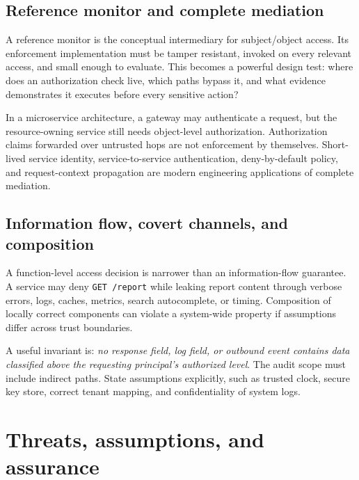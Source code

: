 \documentclass[
  letterpaper,
]{article}
\begin{document}
\subsection{Reference monitor and complete
mediation}\label{reference-monitor-and-complete-mediation}

A reference monitor is the conceptual intermediary for subject/object
access. Its enforcement implementation must be tamper resistant, invoked
on every relevant access, and small enough to evaluate. This becomes a
powerful design test: where does an authorization check live, which
paths bypass it, and what evidence demonstrates it executes before every
sensitive action?

\begin{modernextension}
In a microservice architecture, a gateway may authenticate a request, but the resource-owning service still needs object-level authorization. Authorization claims forwarded over untrusted hops are not enforcement by themselves. Short-lived service identity, service-to-service authentication, deny-by-default policy, and request-context propagation are modern engineering applications of complete mediation.
\end{modernextension}

\subsection{Information flow, covert channels, and
composition}\label{information-flow-covert-channels-and-composition}

A function-level access decision is narrower than an information-flow
guarantee. A service may deny \texttt{GET\ /report} while leaking report
content through verbose errors, logs, caches, metrics, search
autocomplete, or timing. Composition of locally correct components can
violate a system-wide property if assumptions differ across trust
boundaries.

A useful invariant is: \emph{no response field, log field, or outbound
event contains data classified above the requesting principal's
authorized level}. The audit scope must include indirect paths. State
assumptions explicitly, such as trusted clock, secure key store, correct
tenant mapping, and confidentiality of system logs.

\section{Threats, assumptions, and
assurance}\label{threats-assumptions-and-assurance}
\end{document}
